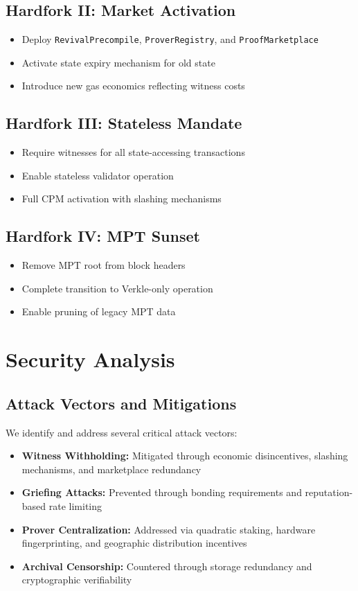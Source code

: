 \documentclass{article}
\begin{document}
\subsection{Hardfork II: Market Activation}
\begin{itemize}
\item Deploy \texttt{RevivalPrecompile}, \texttt{ProverRegistry}, and \texttt{ProofMarketplace}
\item Activate state expiry mechanism for old state
\item Introduce new gas economics reflecting witness costs
\end{itemize}

\subsection{Hardfork III: Stateless Mandate}
\begin{itemize}
\item Require witnesses for all state-accessing transactions
\item Enable stateless validator operation
\item Full CPM activation with slashing mechanisms
\end{itemize}

\subsection{Hardfork IV: MPT Sunset}
\begin{itemize}
\item Remove MPT root from block headers
\item Complete transition to Verkle-only operation
\item Enable pruning of legacy MPT data
\end{itemize}

\section{Security Analysis}

\subsection{Attack Vectors and Mitigations}

We identify and address several critical attack vectors:

\begin{itemize}
\item \textbf{Witness Withholding:} Mitigated through economic disincentives, slashing mechanisms, and marketplace redundancy
\item \textbf{Griefing Attacks:} Prevented through bonding requirements and reputation-based rate limiting
\item \textbf{Prover Centralization:} Addressed via quadratic staking, hardware fingerprinting, and geographic distribution incentives
\item \textbf{Archival Censorship:} Countered through storage redundancy and cryptographic verifiability
\end{itemize}
\end{document}
